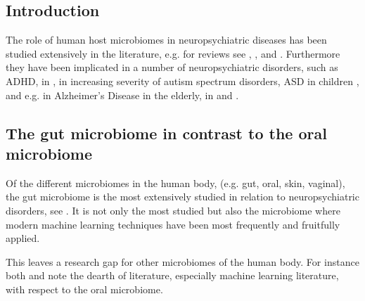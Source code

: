 \documentclass{article}
\begin{document}
\begin{multicols}{2}
\section{Introduction}
The role of human host microbiomes in neuropsychiatric diseases has been studied extensively in the literature, e.g. for reviews see \cite{goswami_role_2021}, \cite{hashimoto_emerging_2023}, and \cite{bonnechere}. Furthermore they have been implicated in a number of neuropsychiatric disorders, such as ADHD, in \cite{bull-larsen_potential_2019}, in increasing severity of autism spectrum disorders, ASD in children \cite{TOMOVA2015179}, and e.g. in Alzheimer's Disease in the elderly, in \cite{yk_microbiota-gut-brain_2018} and \cite{escobar_influence_2022}.
\subsection{The gut microbiome in contrast to the oral microbiome}
Of the different microbiomes in the human body, (e.g. gut, oral, skin, vaginal), the gut microbiome is the most extensively studied in relation to neuropsychiatric disorders, see \cite{sorboni_comprehensive_2022}. It is not only the most studied but also the microbiome where modern machine learning techniques have been most frequently and fruitfully applied. 

This leaves a research gap for other microbiomes of the human body. For instance both \cite{goswami_role_2021} and \cite{tao_relationship_2024} note the dearth of literature, especially machine learning literature, with respect to the oral microbiome.


\end{multicols}
\end{document}

